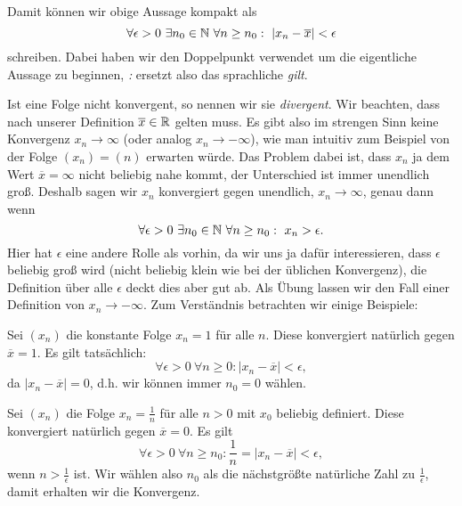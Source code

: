Damit können wir obige Aussage kompakt als
\begin{equation*}
\forall \epsilon > 0 ~\exists n_0 \in \mathbb{N} ~\forall n \geq n_0: ~\vert x_n - \overline{x} \vert < \epsilon
\end{equation*}
schreiben. Dabei haben wir den Doppelpunkt verwendet um die eigentliche Aussage zu beginnen, \emph{:} ersetzt also das sprachliche \emph{gilt}.

Ist eine Folge nicht konvergent, so nennen wir sie \emph{divergent}. Wir beachten, dass nach unserer Definition \(\overline{x} \in \mathbb{R}\) gelten muss. Es gibt also im strengen Sinn keine Konvergenz \(x_n \rightarrow \infty\) (oder analog \(x_n \rightarrow -\infty\)), wie man intuitiv zum Beispiel von der Folge \((x_n) = (n)\) erwarten würde. Das Problem dabei ist, dass \(x_n\) ja dem Wert \(\overline{x}=\infty\) nicht beliebig nahe kommt, der Unterschied ist immer unendlich groß. Deshalb sagen wir \(x_n\) konvergiert gegen unendlich, \(x_n \rightarrow \infty\), genau dann wenn
\begin{equation*}
 \forall \epsilon > 0 ~\exists n_0 \in \mathbb{N} ~\forall n \geq n_0: ~ x_n > \epsilon .
\end{equation*}
Hier hat \(\epsilon\) eine andere Rolle als vorhin, da wir uns ja dafür interessieren, dass \(\epsilon\) beliebig groß wird (nicht beliebig klein wie bei der üblichen Konvergenz), die Definition über alle \(\epsilon\) deckt dies aber gut ab. Als Übung lassen wir den Fall einer Definition von \(x_n \rightarrow -  \infty\). Zum Verständnis betrachten wir einige Beispiele:
\label{vorkurs/folgen:example-1}
\begin{example}{}{}



Sei \((x_n)\) die konstante Folge \(x_n = 1 \) für alle \(n\). Diese konvergiert natürlich gegen \(\overline{x} = 1\). Es gilt tatsächlich:
\begin{equation*}
 \forall \epsilon > 0 ~\forall n \geq 0:  \vert x_n - \overline{x}\vert < \epsilon,\end{equation*}
da \(\vert x_n - \overline{x}\vert =0\), d.h. wir können immer \(n_0=0\) wählen.
\end{example}
\label{vorkurs/folgen:example-2}
\begin{example}{}{}



Sei \((x_n)\) die  Folge \(x_n = \frac{1}n \) für alle \(n>0\) mit \(x_0\) beliebig definiert. Diese konvergiert natürlich gegen \(\overline{x} = 0\). Es gilt
\begin{equation*}
 \forall \epsilon > 0 ~\forall n \geq n_0:  \frac{1}n = \vert x_n - \overline{x}\vert < \epsilon,\end{equation*}
wenn \(n > \frac{1}\epsilon\) ist. Wir wählen also \(n_0\) als die nächstgrößte natürliche Zahl zu \(\frac{1}\epsilon\), damit erhalten wir die Konvergenz.
\end{example}
